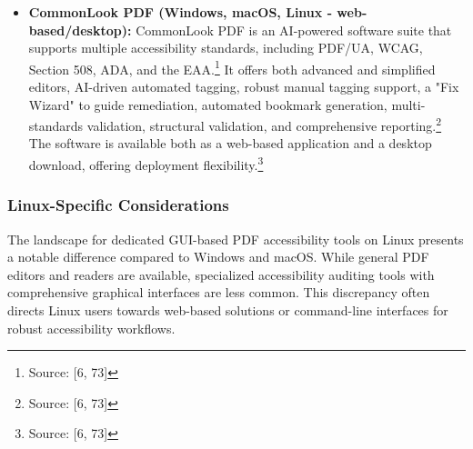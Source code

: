 \begin{itemize}[noitemsep,topsep=0pt]
    \item \textbf{CommonLook PDF (Windows, macOS, Linux - web-based/desktop):} CommonLook PDF is an AI-powered software suite that supports multiple accessibility standards, including PDF/UA, WCAG, Section 508, ADA, and the EAA.\footnote{Source: [6, 73]} It offers both advanced and simplified editors, AI-driven automated tagging, robust manual tagging support, a "Fix Wizard" to guide remediation, automated bookmark generation, multi-standards validation, structural validation, and comprehensive reporting.\footnote{Source: [6, 73]} The software is available both as a web-based application and a desktop download, offering deployment flexibility.\footnote{Source: [6, 73]}
\end{itemize}

\subsubsection{Linux-Specific Considerations}

The landscape for dedicated GUI-based PDF accessibility tools on Linux presents a notable difference compared to Windows and macOS. While general PDF editors and readers are available, specialized accessibility auditing tools with comprehensive graphical interfaces are less common. This discrepancy often directs Linux users towards web-based solutions or command-line interfaces for robust accessibility workflows.

